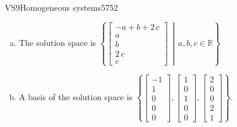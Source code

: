 \begin{exercise}{VS9}{Homogeneous systems}{5752}
\begin{exerciseAnswer}
\begin{enumerate}[(a)]
\item The solution space is \( \left\{ \left[\begin{array}{c}
-a + b + 2 \, c \\
a \\
b \\
2 \, c \\
c
\end{array}\right] \,\middle|\, a,b,c \in\mathbb R \right\} \) 
\item A basis of the solution space is \(\left\{ \left[\begin{array}{c}
-1 \\
1 \\
0 \\
0 \\
0
\end{array}\right] , \left[\begin{array}{c}
1 \\
0 \\
1 \\
0 \\
0
\end{array}\right] , \left[\begin{array}{c}
2 \\
0 \\
0 \\
2 \\
1
\end{array}\right] \right\}\).
\end{enumerate}

     \end{exerciseAnswer}
 \end{exercise}


